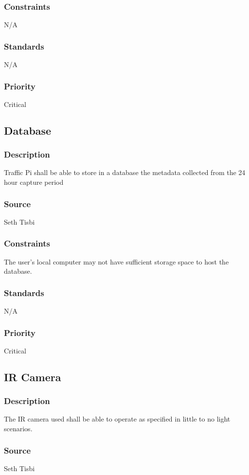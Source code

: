 \subsubsection{Constraints}
N/A
\subsubsection{Standards}
N/A
\subsubsection{Priority}
Critical

\subsection{Database}
\subsubsection{Description}
Traffic Pi shall be able to store in a database the metadata collected from the 24 hour capture period
\subsubsection{Source}
Seth Tisbi
\subsubsection{Constraints}
The user's local computer may not have sufficient storage space to host the database.
\subsubsection{Standards}
N/A
\subsubsection{Priority}
Critical

\subsection{IR Camera}
\subsubsection{Description}
The IR camera used shall be able to operate as specified in little to no light scenarios.
\subsubsection{Source}
Seth Tisbi
